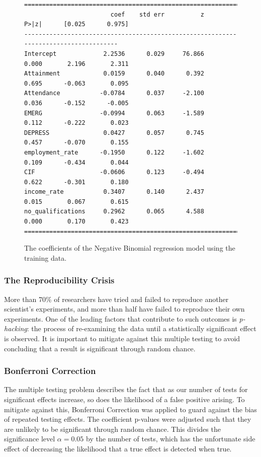 \documentclass{thesis}
\begin{document}
\begin{figure}[h]
    \centering
\footnotesize
\begin{verbatim}
=====================================================================================
                        coef    std err          z      P>|z|      [0.025      0.975]
-------------------------------------------------------------------------------------
Intercept             2.2536      0.029     76.866      0.000       2.196       2.311
Attainment            0.0159      0.040      0.392      0.695      -0.063       0.095
Attendance           -0.0784      0.037     -2.100      0.036      -0.152      -0.005
EMERG                -0.0994      0.063     -1.589      0.112      -0.222       0.023
DEPRESS               0.0427      0.057      0.745      0.457      -0.070       0.155
employment_rate      -0.1950      0.122     -1.602      0.109      -0.434       0.044
CIF                  -0.0606      0.123     -0.494      0.622      -0.301       0.180
income_rate           0.3407      0.140      2.437      0.015       0.067       0.615
no_qualifications     0.2962      0.065      4.588      0.000       0.170       0.423
=====================================================================================
\end{verbatim}
\normalsize
    \caption{The coefficients of the Negative Binomial regression model using the training data.}
    \label{fig:nb-coeff}
\end{figure}

\subsubsection{The Reproducibility Crisis}

More than 70\% of researchers have tried and failed to reproduce another scientist's experiments, and more than half have failed to reproduce their own experiments\cite{Baker2016}. One of the leading factors that contribute to such outcomes is \textit{p-hacking}: the process of re-examining the data until a statistically significant effect is observed. It is important to mitigate against this multiple testing to avoid concluding that a result is significant through random chance.

\subsubsection{Bonferroni Correction}

The multiple testing problem describes the fact that as our number of tests for significant effects increase, so does the likelihood of a false positive arising. To mitigate against this, Bonferroni Correction was applied to guard against the bias of repeated testing effects. The coefficient p-values were adjusted such that they are unlikely to be significant through random chance. This divides the significance level $\alpha = 0.05$ by the number of tests, which has the unfortunate side effect of decreasing the likelihood that a true effect is detected when true.
\end{document}
